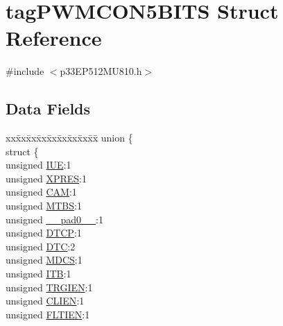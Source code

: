\hypertarget{structtag_p_w_m_c_o_n5_b_i_t_s}{}\section{tag\+P\+W\+M\+C\+O\+N5\+B\+I\+TS Struct Reference}
\label{structtag_p_w_m_c_o_n5_b_i_t_s}


{\ttfamily \#include $<$p33\+E\+P512\+M\+U810.\+h$>$}

\subsection*{Data Fields}
\begin{DoxyCompactItemize}
\item 
\begin{tabbing}
xx\=xx\=xx\=xx\=xx\=xx\=xx\=xx\=xx\=\kill
union \{\\
\>struct \{\\
\>\>unsigned \hyperlink{structtag_p_w_m_c_o_n5_b_i_t_s_a2b95b61e8c208d0ffdc7441133d3b0a3}{IUE}:1\\
\>\>unsigned \hyperlink{structtag_p_w_m_c_o_n5_b_i_t_s_a6a3f824223966417e0005dbe08b1833c}{XPRES}:1\\
\>\>unsigned \hyperlink{structtag_p_w_m_c_o_n5_b_i_t_s_a912fd2c19cfc2bb7d43e4cb3bae4d0bf}{CAM}:1\\
\>\>unsigned \hyperlink{structtag_p_w_m_c_o_n5_b_i_t_s_ad4b1db357995f4e3ff43d2e6c734159e}{MTBS}:1\\
\>\>unsigned \hyperlink{structtag_p_w_m_c_o_n5_b_i_t_s_adf71f3d8410c1f1dbbc96680a92c49af}{\_\_pad0\_\_}:1\\
\>\>unsigned \hyperlink{structtag_p_w_m_c_o_n5_b_i_t_s_a42fd7808d2a3b328aac343a2c4e781d7}{DTCP}:1\\
\>\>unsigned \hyperlink{structtag_p_w_m_c_o_n5_b_i_t_s_a0ac766a24b648c50040810c3f207926c}{DTC}:2\\
\>\>unsigned \hyperlink{structtag_p_w_m_c_o_n5_b_i_t_s_acb5516c8c2c937478d0e653afdb05254}{MDCS}:1\\
\>\>unsigned \hyperlink{structtag_p_w_m_c_o_n5_b_i_t_s_a5d923b710199bb786b4c9f1d71b104f2}{ITB}:1\\
\>\>unsigned \hyperlink{structtag_p_w_m_c_o_n5_b_i_t_s_a4dd5600256667e48b1fe49e80ef95d33}{TRGIEN}:1\\
\>\>unsigned \hyperlink{structtag_p_w_m_c_o_n5_b_i_t_s_a6536fa9a3ad62ffb7a3ed0a2b1bf6394}{CLIEN}:1\\
\>\>unsigned \hyperlink{structtag_p_w_m_c_o_n5_b_i_t_s_a4d88b1c37d3feefa1055445ffc9a981c}{FLTIEN}:1\\

\end{tabbing}
\end{DoxyCompactItemize}

